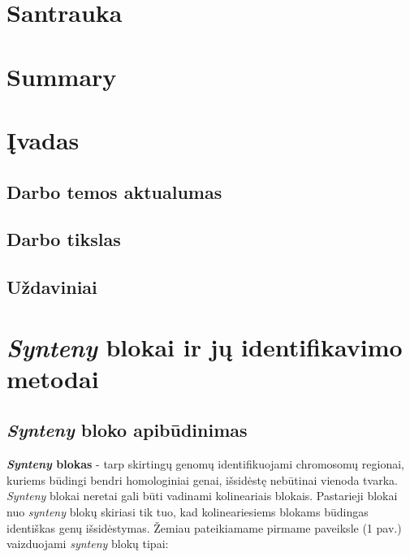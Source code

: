 \documentclass[12pt]{article}
\begin{document}
\section*{Santrauka}
\newpage


\section*{Summary}
\newpage


\section{Įvadas}
\subsection*{Darbo temos aktualumas}
\subsection*{Darbo tikslas}
\subsection*{Uždaviniai}

\newpage


\section{\emph{Synteny} blokai ir jų identifikavimo metodai}
\subsection{\emph{Synteny} bloko apibūdinimas}

\textbf{\emph{Synteny} blokas} - tarp skirtingų genomų identifikuojami
chromosomų regionai, kuriems būdingi bendri homologiniai genai, 
išsidėstę nebūtinai vienoda tvarka. \emph{Synteny} blokai neretai gali būti
vadinami kolineariais blokais. Pastarieji blokai nuo \emph{synteny} blokų
skiriasi tik tuo, kad kolineariesiems blokams būdingas identiškas genų
išsidėstymas. Žemiau pateikiamame pirmame paveiksle (1 pav.) vaizduojami
\emph{synteny} blokų tipai:
\end{document}
